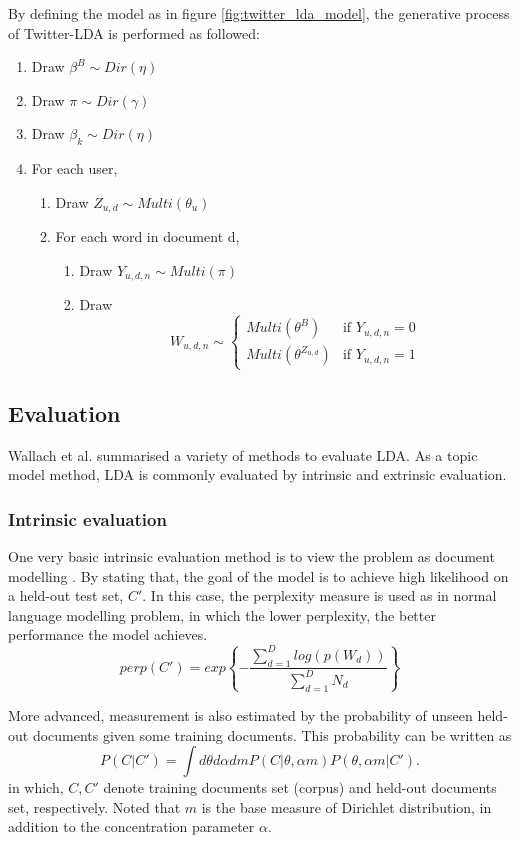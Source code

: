 \documentclass[11pt]{article}
\begin{document}
By defining the model as in figure \ref{fig:twitter_lda_model}, the generative process of Twitter-LDA is performed as followed:
\begin{enumerate}
	\item Draw $\beta^B \sim Dir(\eta)$
	\item Draw $\pi \sim Dir(\gamma)$
	\item Draw $\beta_k \sim Dir(\eta)$
	\item For each user,
	\begin{enumerate}
		\item Draw $Z_{u,d} \sim Multi(\theta_u)$
		\item For each word in document d,
		\begin{enumerate}
			\item Draw $Y_{u,d,n} \sim Multi(\pi)$
			\item Draw \[W_{u,d,n} \sim 
			\begin{cases}
			Multi(\theta^B) & \text{if $Y_{u,d,n} = 0$}\\
			Multi(\theta^{Z_{u,d}}) & \text{if $Y_{u,d,n} = 1$}
			\end{cases}\]
		\end{enumerate}
	\end{enumerate}
\end{enumerate}

\subsection{Evaluation} \label{evaluation}

Wallach et al. \cite{Wallach2009a} summarised a variety of methods to evaluate LDA. As a topic model method, LDA is commonly evaluated by intrinsic and extrinsic evaluation. 

\subsubsection{Intrinsic evaluation}
One very basic intrinsic evaluation method is to view the problem as document modelling \cite{Blei2003}. By stating that, the goal of the model is to achieve high likelihood on a held-out test set, $C'$. In this case, the perplexity measure is used as in normal language modelling problem, in which the lower perplexity, the better performance the model achieves.
\[perp(C')=exp\left\{-\frac{\sum_{d=1}^{D}{log(p(W_d))}}{\sum_{d=1}^{D}N_d}\right\}\]

More advanced, measurement is also estimated by the probability of unseen held-out documents given some training documents. This probability can be written as \cite{Wallach2009a}
\[P(C|C')=\int d\theta d\alpha dm P(C|\theta,\alpha m)P(\theta,\alpha m|C').\]
in which, $C, C'$ denote training documents set (corpus) and held-out documents set, respectively. Noted that $m$ is the base measure of Dirichlet distribution, in addition to the concentration parameter $\alpha$.
\end{document}

